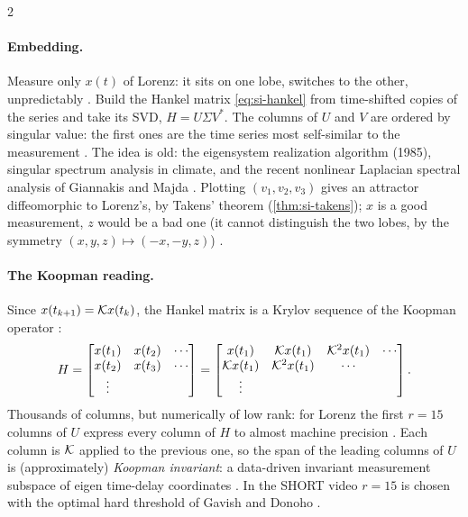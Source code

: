 \begin{paracol}{2}
\paragraph{Embedding.} Measure only $x(t)$ of Lorenz: it sits on one lobe, switches to the other, unpredictably
. Build the Hankel matrix \eqref{eq:si-hankel} from time-shifted copies of the series
 and take its SVD, $H=U\Sigma V^*$. The columns of $U$ and $V$ are ordered by singular value: the
first ones are the time series most self-similar to the measurement . The idea is old:
the eigensystem realization algorithm (1985), singular spectrum analysis in climate, and the recent nonlinear Laplacian
spectral analysis of Giannakis and Majda . Plotting $(v_1,v_2,v_3)$ gives an attractor
diffeomorphic to Lorenz's, by Takens' theorem (\cref{thm:si-takens}); $x$ is a good measurement, $z$ would be a bad one
(it cannot distinguish the two lobes, by the symmetry $(x,y,z)\mapsto(-x,-y,z)$) .

\paragraph{The Koopman reading.} Since $x(t_{k+1})=\mathcal{K} x(t_k)$, the Hankel matrix is a Krylov sequence of the Koopman operator
:
\begin{equation}\label{eq:hv-krylov}
  H=\begin{bmatrix}x(t_1)&x(t_2)&\cdots\\ x(t_2)&x(t_3)&\cdots\\ \vdots&&\end{bmatrix}
   =\begin{bmatrix}x(t_1)&\mathcal{K} x(t_1)&\mathcal{K}^2x(t_1)&\cdots\\ \mathcal{K} x(t_1)&\mathcal{K}^2x(t_1)&\cdots\\ \vdots&&\end{bmatrix}.
\end{equation}
Thousands of columns, but numerically of low rank: for Lorenz the first $r=15$ columns of $U$ express every column of $H$ to
almost machine precision . Each column is $\mathcal{K}$ applied to the previous one, so the
span of the leading columns of $U$ is (approximately) \emph{Koopman invariant}: a data-driven invariant measurement subspace of
eigen time-delay coordinates . In the SHORT video $r=15$ is chosen with the optimal
hard threshold of Gavish and Donoho .


\end{paracol}

